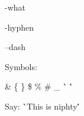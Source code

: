 \documentclass{article}
\begin{document}
-what

\--hyphen

\---dash

Symbols:

\& \{ \} \$ \% \# \_ \`` \''

Say: \``This is niphty\''
\end{document}
